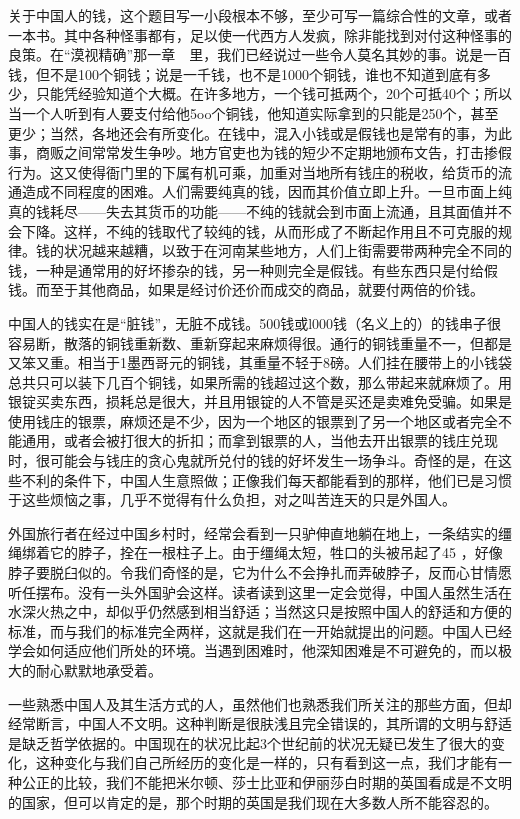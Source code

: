 \documentclass[12pt,oneside]{book}
\begin{document}
\begin{common-format}
关于中国人的钱，这个题目写一小段根本不够，至少可写一篇综合性的文章，或者一本书。其中各种怪事都有，足以使一代西方人发疯，除非能找到对付这种怪事的良策。在“漠视精确”那一章　里，我们已经说过一些令人莫名其妙的事。说是一百钱，但不是100个铜钱；说是一千钱，也不是1000个铜钱，谁也不知道到底有多少，只能凭经验知道个大概。在许多地方，一个钱可抵两个，20个可抵40个；所以当一个人听到有人要支付给他5oo个铜钱，他知道实际拿到的只能是250个，甚至更少；当然，各地还会有所变化。在钱中，混入小钱或是假钱也是常有的事，为此事，商贩之间常常发生争吵。地方官吏也为钱的短少不定期地颁布文告，打击掺假行为。这又使得衙门里的下属有机可乘，加重对当地所有钱庄的税收，给货币的流通造成不同程度的困难。人们需要纯真的钱，因而其价值立即上升。一旦市面上纯真的钱耗尽——失去其货币的功能——不纯的钱就会到市面上流通，且其面值并不会下降。这样，不纯的钱取代了较纯的钱，从而形成了不断起作用且不可克服的规律。钱的状况越来越糟，以致于在河南某些地方，人们上街需要带两种完全不同的钱，一种是通常用的好坏掺杂的钱，另一种则完全是假钱。有些东西只是付给假钱。而至于其他商品，如果是经讨价还价而成交的商品，就要付两倍的价钱。 

中国人的钱实在是“脏钱”，无脏不成钱。500钱或l000钱（名义上的）的钱串子很容易断，散落的铜钱重新数、重新穿起来麻烦得很。通行的铜钱重量不一，但都是又笨又重。相当于1墨西哥元的铜钱，其重量不轻于8磅。人们挂在腰带上的小钱袋总共只可以装下几百个铜钱，如果所需的钱超过这个数，那么带起来就麻烦了。用银锭买卖东西，损耗总是很大，并且用银锭的人不管是买还是卖难免受骗。如果是使用钱庄的银票，麻烦还是不少，因为一个地区的银票到了另一个地区或者完全不能通用，或者会被打很大的折扣；而拿到银票的人，当他去开出银票的钱庄兑现时，很可能会与钱庄的贪心鬼就所兑付的钱的好坏发生一场争斗。奇怪的是，在这些不利的条件下，中国人生意照做；正像我们每天都能看到的那样，他们已是习惯于这些烦恼之事，几乎不觉得有什么负担，对之叫苦连天的只是外国人。 

外国旅行者在经过中国乡村时，经常会看到一只驴伸直地躺在地上，一条结实的缰绳绑着它的脖子，拴在一根柱子上。由于缰绳太短，牲口的头被吊起了45 ，好像脖子要脱臼似的。令我们奇怪的是，它为什么不会挣扎而弄破脖子，反而心甘情愿听任摆布。没有一头外国驴会这样。读者读到这里一定会觉得，中国人虽然生活在水深火热之中，却似乎仍然感到相当舒适；当然这只是按照中国人的舒适和方便的标准，而与我们的标准完全两样，这就是我们在一开始就提出的问题。中国人已经学会如何适应他们所处的环境。当遇到困难时，他深知困难是不可避免的，而以极大的耐心默默地承受着。 

一些熟悉中国人及其生活方式的人，虽然他们也熟悉我们所关注的那些方面，但却经常断言，中国人不文明。这种判断是很肤浅且完全错误的，其所谓的文明与舒适是缺乏哲学依据的。中国现在的状况比起3个世纪前的状况无疑已发生了很大的变化，这种变化与我们自己所经历的变化是一样的，只有看到这一点，我们才能有一种公正的比较，我们不能把米尔顿、莎士比亚和伊丽莎白时期的英国看成是不文明的国家，但可以肯定的是，那个时期的英国是我们现在大多数人所不能容忍的。 


\end{common-format}
\end{document}
